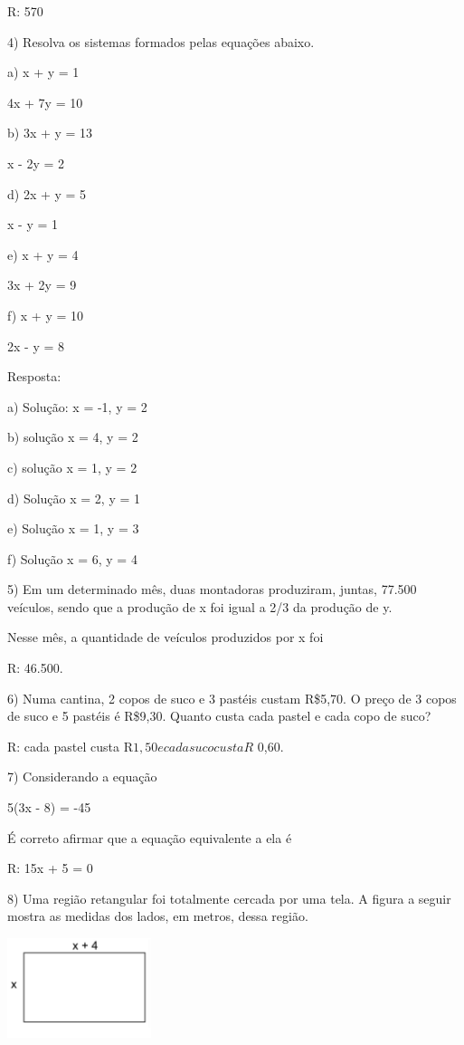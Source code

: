 R: 570

4) Resolva os sistemas formados pelas equações abaixo.

a) x + y = 1

4x + 7y = 10

b) 3x + y = 13

x - 2y = 2

d) 2x + y = 5

x - y = 1

e) x + y = 4

3x + 2y = 9

f) x + y = 10

2x - y = 8

Resposta:

a) Solução: x = -1, y = 2

b) solução x = 4, y = 2

c) solução x = 1, y = 2

d) Solução x = 2, y = 1

e) Solução x = 1, y = 3

f) Solução x = 6, y = 4

5) Em um determinado mês, duas montadoras produziram, juntas, 77.500
veículos, sendo que a produção de x foi igual a 2/3 da produção de y.

Nesse mês, a quantidade de veículos produzidos por x foi

R: 46.500.

6) Numa cantina, 2 copos de suco e 3 pastéis custam R\$5,70. O preço de
3 copos de suco e 5 pastéis é R\$9,30. Quanto custa cada pastel e cada
copo de suco?

R: cada pastel custa R\(1,50 e cada suco custa R\) 0,60.

7) Considerando a equação

5(3x - 8) = -45

É correto afirmar que a equação equivalente a ela é

R: 15x + 5 = 0

8) Uma região retangular foi totalmente cercada por uma tela. A figura a
seguir mostra as medidas dos lados, em metros, dessa região.

\includegraphics[width=1.65625in,height=1.14583in]{./imgSAEB_6_MAT/media/image38.png}

